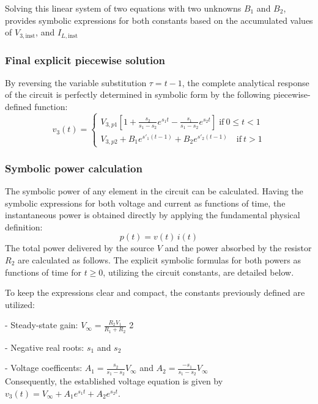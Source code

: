 \documentclass[energies,accept,oneauthor,pdftex]{Definitions/mdpi}
\begin{document}
Solving this linear system of two equations with two unknowns
$B_1$ and $B_2$, provides symbolic expressions for both constants based on the accumulated values of $V_{3,\mathrm{inst}}$, and $I_{L,\mathrm{inst}}$


\subsubsection*{Final explicit piecewise solution}

By reversing the variable substitution $\tau = t - 1$, the complete analytical response of the circuit is perfectly determined in symbolic form by the following piecewise-defined function:
\[
 v_3(t) =
\begin{cases}
  V_{3,p1} \left[1+\frac{s_2}{s_1-s_2} e^{s_1t} -  \frac{s_1}{s_1-s_2} e^{s_2t}\right] \; \mathrm{if}\ 0\le t<1  \\
  V_{3,p2} + B_1e^{s'_1(t-1)} + B_2e^{s'_2(t-1)} \quad \mathrm{if}\  t>1
\end{cases}
\]



\subsubsection*{Symbolic power calculation}

The symbolic power of any element in the circuit can be calculated. Having the symbolic expressions for both voltage and current as functions of time, the instantaneous power is obtained directly by applying the fundamental physical definition:
\[
 p(t) = v(t) \, i(t)
 \]
The total power delivered by the source $V$ and the power absorbed by the resistor $R_2$ are calculated as follows. The explicit symbolic formulas for both powers as functions of time for $t \ge 0$, utilizing the circuit constants, are detailed below.

To keep the expressions clear and compact, the constants previously defined are
utilized:

- Steady-state gain: $V_{\infty} = \frac{R_2 V_1}{R_1+R_2}$
2

- Negative real roots: $s_1$ and $s_2$

- Voltage  coefficents: $A_1 = \frac{s_2}{s_1-s_2} V_{\infty}$ and
$A_2 = \frac{-s_1}{s_1-s_2} V_{\infty}$\\
Consequently, the established voltage equation is given by
$v_3 (t) = V_{\infty} + A_1 e^{s_1 t} + A_2 e^{s_2 t}$.

\medskip
\end{document}
